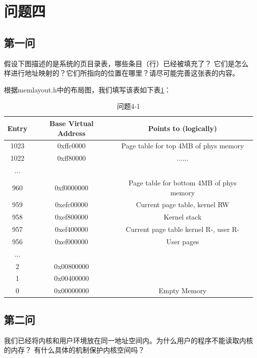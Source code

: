 \documentclass[12pt,a4paper,UTF8]{article}
\begin{document}
\section{问题四}
    \subsection{第一问}
    假设下图描述的是系统的页目录表，哪些条目（行）已经被填充了？
    它们是怎么样进行地址映射的？它们所指向的位置在哪里？请尽可能完善这张表的内容。
    
    根据memlayout.h中的布局图，我们填写该表如下表\ref{tab::table2}：
    \begin{table}[htbp]
        \begin{center}
            \begin{tabular}{c c c}
                \toprule
                Entry & Base Virtual Address & Points to (logically) \\
                \midrule
                1023    &   0xffc0000   &   Page table for top 4MB of phys memory \\
                1022    &   0xff80000   &   ...... \\
                ...     &               &    \\
                960     &   0xf0000000	&	Page table for bottom 4MB of phys memory \\
                959     &   0xefc00000	&	Current page table, kernel RW \\
                958     &   0xef800000	&	Kernel stack \\
                957     &   0xef400000  &   Current page table kernel R-, user R- \\
                956	    &   0xef000000  &	User pages \\
                ...     &               &    \\
                2       &   0x00800000  &    \\
                1       &   0x00400000  &    \\
                0       &   0x00000000  &   Empty Memory \\
                \bottomrule
            \end{tabular}
            \caption{问题4-1}\label{tab::table2}
        \end{center}
    \end{table}

    \subsection{第二问}
    我们已经将内核和用户环境放在同一地址空间内。为什么用户的程序不能读取内核的内存？
    有什么具体的机制保护内核空间吗？
    
\end{document}
